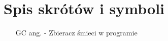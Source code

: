 \chapter{Spis skrótów i symboli}

\begin{itemize}
\item[GC] ang.  - Zbieracz śmieci w programie 
\end{itemize}